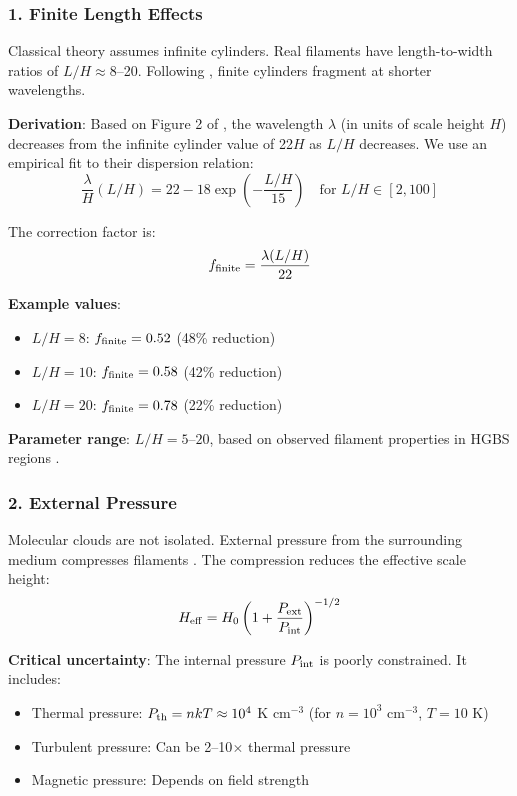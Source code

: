 \documentclass[11pt,a4paper]{article}
\begin{document}
\subsubsection{1. Finite Length Effects}

Classical theory assumes infinite cylinders. Real filaments have length-to-width ratios of $L/H \approx 8$--20. Following \citet{Inutsuka1997}, finite cylinders fragment at shorter wavelengths.

\textbf{Derivation}: Based on Figure 2 of \citet{Inutsuka1997}, the wavelength $\lambda$ (in units of scale height $H$) decreases from the infinite cylinder value of 22$H$ as $L/H$ decreases. We use an empirical fit to their dispersion relation:
\begin{equation}
\frac{\lambda}{H}(L/H) = 22 - 18 \exp\left(-\frac{L/H}{15}\right) \quad \text{for } L/H \in [2, 100]
\end{equation}

The correction factor is:
\begin{equation}
f_{\rm finite} = \frac{\lambda(L/H)}{22}
\end{equation}

\textbf{Example values}:
\begin{itemize}
    \item $L/H = 8$: $f_{\rm finite} = 0.52$ (48\% reduction)
    \item $L/H = 10$: $f_{\rm finite} = 0.58$ (42\% reduction)
    \item $L/H = 20$: $f_{\rm finite} = 0.78$ (22\% reduction)
\end{itemize}

\textbf{Parameter range}: $L/H = 5$--$20$, based on observed filament properties in HGBS regions \citep{Arzoumanian2019}.

\subsubsection{2. External Pressure}

Molecular clouds are not isolated. External pressure from the surrounding medium compresses filaments \citep{Fischera2012}. The compression reduces the effective scale height:
\begin{equation}
H_{\rm eff} = H_0 \left(1 + \frac{P_{\rm ext}}{P_{\rm int}}\right)^{-1/2}
\end{equation}

\textbf{Critical uncertainty}: The internal pressure $P_{\rm int}$ is poorly constrained. It includes:
\begin{itemize}
    \item Thermal pressure: $P_{\rm th} = nkT \approx 10^4$ K cm$^{-3}$ (for $n = 10^3$ cm$^{-3}$, $T = 10$ K)
    \item Turbulent pressure: Can be 2--10$\times$ thermal pressure
    \item Magnetic pressure: Depends on field strength
\end{itemize}
\end{document}

